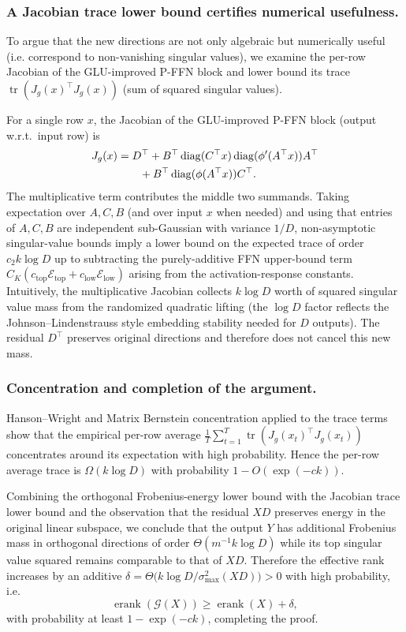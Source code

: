 \documentclass[sigconf,screen]{acmart}
\begin{document}
\subsubsection*{\bf A Jacobian trace lower bound certifies numerical usefulness.}  
To argue that the new directions are not only algebraic but numerically useful (i.e. correspond to non-vanishing singular values), we examine the per-row Jacobian of the GLU-improved P-FFN block and lower bound its trace \( \operatorname{tr}(J_g(x)^\top J_g(x))\) (sum of squared singular values).

For a single row \(x\), the Jacobian of the GLU-improved P-FFN block (output w.r.t.\ input row) is
\begin{align}
J_g(x) &= D^\top
+ B^\top \operatorname{diag}(C^\top x)\operatorname{diag}(\phi'(A^\top x)) A^\top \notag \\
&\qquad + B^\top \operatorname{diag}(\phi(A^\top x)) C^\top.
\end{align}
The multiplicative term contributes the middle two summands. Taking expectation over \(A,C,B\) (and over input \(x\) when needed) and using that entries of \(A,C,B\) are independent sub-Gaussian with variance \(1/D\), non-asymptotic singular-value bounds imply a lower bound on the expected trace of order \(c_2 k\log D\) up to subtracting the purely-additive FFN upper-bound term \(C_K(c_{\mathrm{top}}\mathcal E_{\mathrm{top}}+c_{\mathrm{low}}\mathcal E_{\mathrm{low}})\) arising from the activation-response constants. Intuitively, the multiplicative Jacobian collects \(k\log D\) worth of squared singular value mass from the randomized quadratic lifting (the \(\log D\) factor reflects the Johnson–Lindenstrauss style embedding stability needed for \(D\) outputs). The residual \(D^\top\) preserves original directions and therefore does not cancel this new mass.

\subsubsection*{\bf Concentration and completion of the argument.}  
Hanson–Wright and Matrix Bernstein concentration applied to the trace terms show that the empirical per-row average \(\tfrac{1}{T}\sum_{t=1}^T \operatorname{tr}(J_g(x_t)^\top J_g(x_t))\) concentrates around its expectation with high probability. Hence the per-row average trace is \(\Omega(k\log D)\) with probability \(1-O(\exp(-c k))\).

Combining the orthogonal Frobenius-energy lower bound with the Jacobian trace lower bound and the observation that the residual \(XD\) preserves energy in the original linear subspace, we conclude that the output \(Y\) has additional Frobenius mass in orthogonal directions of order \(\Theta(m^{-1} k\log D)\) while its top singular value squared remains comparable to that of \(XD\). Therefore the effective rank increases by an additive \(\delta=\Theta\big(k\log D/\sigma_{\max}^2(XD)\big)>0\) with high probability, i.e.
\[
\operatorname{erank}(\mathcal G(X)) \ge \operatorname{erank}(X) + \delta,
\]
with probability at least \(1-\exp(-c k)\), completing the proof.
\end{document}
